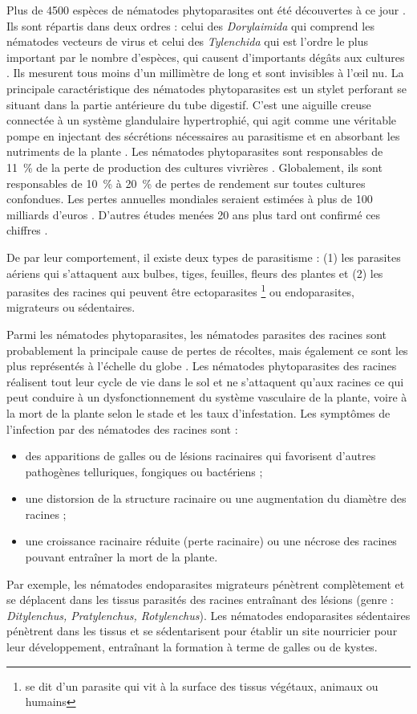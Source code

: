 	Plus de  4500 espèces de nématodes phytoparasites ont été découvertes à ce jour \citep{Decraemer2006}.
Ils sont répartis dans deux ordres : celui des \textit{Dorylaimida} qui comprend les nématodes vecteurs de virus \citep{Maheswari1997} et celui des \textit{Tylenchida} qui est
l’ordre le plus important par le nombre d’espèces,  qui causent d'importants dégâts aux cultures \citep{DeGuiran1983}.
Ils mesurent tous  moins d'un millimètre de long et sont invisibles à l’œil nu.
La principale caractéristique des nématodes phytoparasites est un stylet perforant se situant dans la  partie antérieure du tube digestif. C’est une aiguille creuse
connectée à un système glandulaire hypertrophié, qui agit comme une véritable pompe en injectant des sécrétions nécessaires au parasitisme et en absorbant les nutriments
de la plante \citep{Abad2010}.  Les nématodes phytoparasites sont responsables de 11~\% de la perte de
production  des cultures vivrières \citep{Agrios2005}. Globalement, ils sont responsables de 10~\% à 20~\% de pertes de rendement sur toutes cultures confondues\citep{Raaijmakers2009}.
Les pertes annuelles mondiales seraient
estimées à plus de 100 milliards d’euros \citep{Sasser1987, Chitwood2003}. D'autres études menées 20 ans plus tard ont confirmé ces chiffres \citep{McCarter2009, Chitwood2003, Agrios2005}.
	
	De par leur comportement, il existe deux types de parasitisme : (1) les parasites aériens qui s'attaquent aux bulbes, tiges, feuilles, fleurs des plantes et (2) les parasites des racines qui peuvent être ectoparasites \footnote{se dit d'un parasite qui vit  à la surface des tissus végétaux, animaux ou humains} ou endoparasites, migrateurs  ou sédentaires.  

	Parmi les nématodes phytoparasites, les nématodes parasites des racines sont probablement la principale cause de pertes de récoltes, mais également ce sont  les plus représentés à l'échelle du globe \citep{Bird2003}.  Les nématodes phytoparasites des racines réalisent tout leur cycle de vie dans le sol et ne s’attaquent qu’aux
racines ce qui peut conduire à un dysfonctionnement du système vasculaire de la plante, voire à la mort de la plante selon le stade et les taux d’infestation. 
Les symptômes de l'infection par des nématodes des racines sont : 
	\begin{itemize}[label=--]
	\item des apparitions de galles ou de lésions racinaires qui favorisent d'autres pathogènes telluriques, fongiques 
	      ou bactériens ;
	\item une distorsion de la structure racinaire ou une augmentation du diamètre des racines ;
	\item une croissance racinaire réduite (perte racinaire) ou une  nécrose des racines pouvant entraîner la mort de 
	     la plante.
	\end{itemize}
Par exemple, les nématodes  endoparasites migrateurs pénètrent complètement et se déplacent dans les tissus parasités  des racines entraînant des lésions (genre : \textit{Ditylenchus, Pratylenchus, Rotylenchus}). Les nématodes endoparasites sédentaires pénètrent dans les tissus et se sédentarisent pour établir un site nourricier pour leur développement, entraînant la formation à terme de galles ou de kystes.

